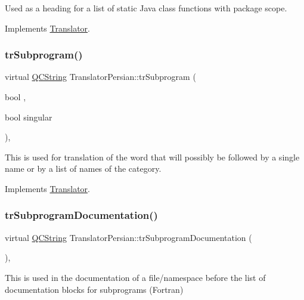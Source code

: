 Used as a heading for a list of static Java class functions with package scope. 

Implements \mbox{\hyperlink{class_translator}{Translator}}.

\mbox{\label{class_translator_persian_a22fb6406f917e03dcaf55e86853d51bc}} 
\subsubsection{\texorpdfstring{trSubprogram()}{trSubprogram()}}
{\footnotesize\ttfamily virtual \mbox{\hyperlink{class_q_c_string}{Q\+C\+String}} Translator\+Persian\+::tr\+Subprogram (\begin{DoxyParamCaption}\item[{bool}]{,  }\item[{bool}]{singular }\end{DoxyParamCaption})\hspace{0.3cm}{\ttfamily [inline]}, {\ttfamily [virtual]}}

This is used for translation of the word that will possibly be followed by a single name or by a list of names of the category. 

Implements \mbox{\hyperlink{class_translator}{Translator}}.

\mbox{\label{class_translator_persian_a7c6c3e03c1c7d985a9ee1ba0a5efa719}} 
\subsubsection{\texorpdfstring{trSubprogramDocumentation()}{trSubprogramDocumentation()}}
{\footnotesize\ttfamily virtual \mbox{\hyperlink{class_q_c_string}{Q\+C\+String}} Translator\+Persian\+::tr\+Subprogram\+Documentation (\begin{DoxyParamCaption}{ }\end{DoxyParamCaption})\hspace{0.3cm}{\ttfamily [inline]}, {\ttfamily [virtual]}}

This is used in the documentation of a file/namespace before the list of documentation blocks for subprograms (Fortran) 

